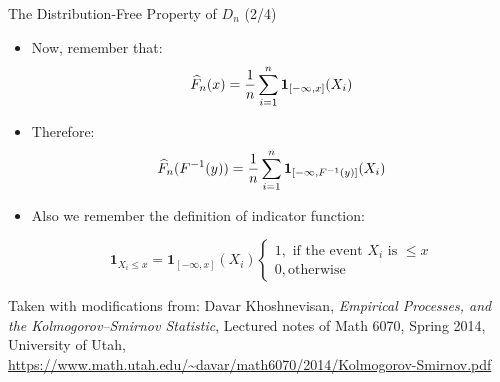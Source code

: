 \documentclass{beamer}
\begin{document}
\begin{frame}
{\centerline{The Distribution-Free Property of $D_n$ (2/4)}}

\begin{itemize}
\item Now, remember that:
$$ \widehat {F}_{n}(x)={1 \over n}\sum _{i=1}^{n}\mathbf {1}_{[-\infty ,x]}(X_{i})$$

\item Therefore:
$$ \widehat {F}_{n}(F^{-1}(y))={1 \over n}\sum _{i=1}^{n}\mathbf {1}_{[-\infty ,F^{-1}(y)]}(X_{i}) $$

\item Also we remember the definition of indicator function:

\begin{equation*}
 \mathbf {1} _{X_{i}\leq x}  =  \mathbf {1}_{[-\infty ,x]}(X_{i})
\begin{cases}
  1, \text{ if the event } X_{i} \text{ is  } \le x\\      
  0, \text{otherwise}
  \end{cases}
\end{equation*}

\end{itemize}

\begin{center}
\tiny{Taken with modifications from: Davar Khoshnevisan, \textit{Empirical Processes, and the Kolmogorov–Smirnov Statistic}, Lectured notes of Math 6070, Spring 2014, University of Utah, \url{https://www.math.utah.edu/~davar/math6070/2014/Kolmogorov-Smirnov.pdf}}
\end{center}

\end{frame}
\end{document}
